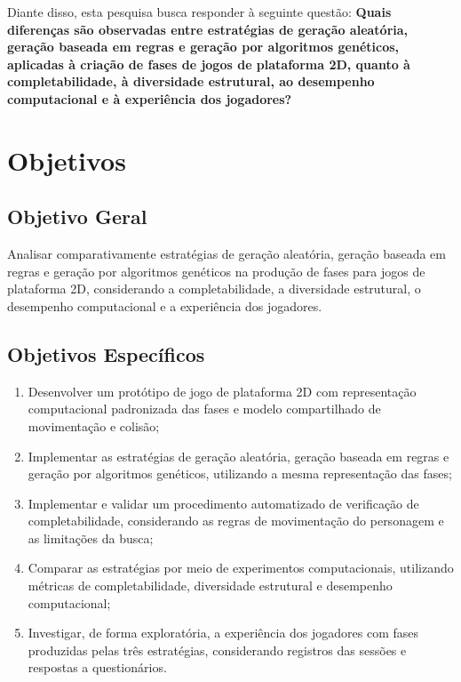Diante disso, esta pesquisa busca responder à seguinte questão:
\textbf{Quais diferenças são observadas entre estratégias de geração 
aleatória, geração baseada em regras e geração por algoritmos genéticos, 
aplicadas à criação de fases de jogos de plataforma 2D, quanto à 
completabilidade, à diversidade estrutural, ao desempenho computacional e 
à experiência dos jogadores?}


\section{Objetivos}

\subsection{Objetivo Geral}

Analisar comparativamente estratégias de geração aleatória, geração baseada 
em regras e geração por algoritmos genéticos na produção de fases para jogos 
de plataforma 2D, considerando a completabilidade, a diversidade estrutural, 
o desempenho computacional e a experiência dos jogadores.

\subsection{Objetivos Específicos}

\begin{enumerate}
    \item Desenvolver um protótipo de jogo de plataforma 2D com representação 
    computacional padronizada das fases e modelo compartilhado de movimentação 
    e colisão;

    \item Implementar as estratégias de geração aleatória, geração baseada em 
    regras e geração por algoritmos genéticos, utilizando a mesma representação 
    das fases;

    \item Implementar e validar um procedimento automatizado de verificação de 
    completabilidade, considerando as regras de movimentação do personagem e as 
    limitações da busca;

    \item Comparar as estratégias por meio de experimentos computacionais, 
    utilizando métricas de completabilidade, diversidade estrutural e 
    desempenho computacional;

    \item Investigar, de forma exploratória, a experiência dos jogadores com 
    fases produzidas pelas três estratégias, considerando registros das sessões 
    e respostas a questionários.
\end{enumerate}

